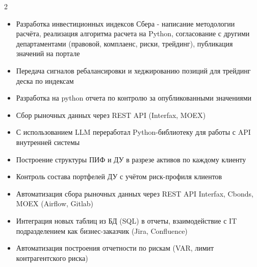 \documentclass[9pt,a4paper,ragged2e]{altacv}
\begin{document}

\begin{fullwidth}
\makecvheader
\end{fullwidth}


\begin{paracol}{2}


\skipsmall
\begin{itemize}[leftmargin=12pt]
  \item Разработка инвестиционных индексов Сбера - написание методологии расчёта, реализация алгоритма расчета на Python, согласование с другими департаментами (правовой, комплаенс, риски, трейдинг), публикация значений на портале
  \item Передача сигналов ребалансировки и хеджированию позиций для трейдинг деска по индексам
  \item Разработка на python отчета по контролю за опубликованными значениями
  \item Сбор рыночных данных через REST API (Interfax, MOEX)
  \item С использованием LLM переработал Python-библиотеку для работы с API внутренней системы
\end{itemize}

\divider

\skipsmall
\begin{itemize}[leftmargin=12pt]
  \item Построение структуры ПИФ и ДУ в разрезе активов по каждому клиенту
  \item Контроль состава портфелей ДУ с учётом риск-профиля клиентов
  \item Автоматизация сбора рыночных данных через REST API Interfax, Cbonds, MOEX (Airflow, Gitlab)
  \item Интеграция новых таблиц из БД (SQL) в отчеты, взаимодействие с IT подразделением как бизнес-заказчик (Jira, Confluence)
  \item Автоматизация построения отчетности по рискам (VAR, лимит контрагентского риска)
\end{itemize}


\end{paracol}
\end{document}
